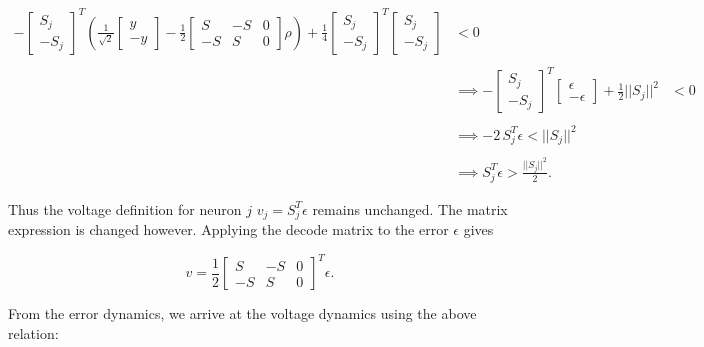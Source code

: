\begin{enumerate}
\begin{align*}
- \begin{bmatrix}
S_j \\ -S_j
\end{bmatrix}^T \left( \frac{1}{\sqrt{2}}
\begin{bmatrix}
y \\-y
\end{bmatrix}
-
\frac{1}{2}
\begin{bmatrix}
S & - S & 0 
\\
-S & S & 0
\end{bmatrix}\rho \right)
+
\frac{1}{4}
\begin{bmatrix}
S_j \\ -S_j
\end{bmatrix}^T\begin{bmatrix}
S_j \\ -S_j
\end{bmatrix} &< 0
\\
\\
&\implies
-\begin{bmatrix}
S_j \\
-S_j
\end{bmatrix}^T
\begin{bmatrix}
\epsilon 
\\
-\epsilon
\end{bmatrix} + \frac{1}{2}||S_j||^2 &< 0
\\
\\
&\implies
-2 \, S_j^T \epsilon < ||S_j||^2
\\
\\
&\implies
S_j^T \epsilon > \frac{||S_j||^2}{2}.
\end{align*}

Thus the voltage definition for neuron $j$ $v_j = S_j^T \epsilon$ remains unchanged. The matrix expression is changed however. Applying the decode matrix to the error $\epsilon$ gives

$$
v = 
\frac{1}{2}
\begin{bmatrix}
S & - S & 0
\\
-S & S & 0
\end{bmatrix}^T \epsilon.
$$

From the error dynamics, we arrive at the voltage dynamics using the above relation:


\end{enumerate}
